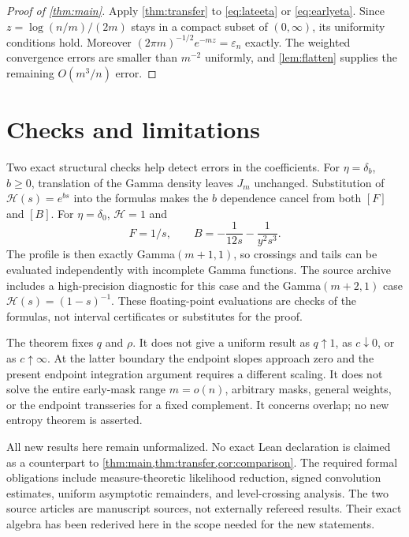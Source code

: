\documentclass[11pt,oneside]{article}
\theoremstyle{remark}\newtheorem{remark}[theorem]{Remark}
\newcommand{\eps}{\varepsilon}
\newcommand{\HH}{\mathcal H}
\numberwithin{equation}{section}
\begin{document}
\begin{proof}[Proof of \cref{thm:main}]
Apply \cref{thm:transfer} to \eqref{eq:lateeta} or \eqref{eq:earlyeta}.
Since $z=\log(n/m)/(2m)$ stays in a compact subset of $(0,\infty)$,
its uniformity conditions hold. Moreover
$(2\pi m)^{-1/2}e^{-mz}=\eps_n$ exactly.
The weighted convergence errors are smaller than $m^{-2}$ uniformly,
and \cref{lem:flatten} supplies the remaining $O(m^3/n)$ error.
\end{proof}

\section{Checks and limitations}
Two exact structural checks help detect errors in the coefficients.
For $\eta=\delta_b$, $b\ge0$, translation of the Gamma density leaves
$J_m$ unchanged. Substitution of $\HH(s)=e^{bs}$ into the formulas makes
the $b$ dependence cancel from both $[F]$ and $[B]$.
For $\eta=\delta_0$, $\HH=1$ and
\begin{equation}
 F=1/s,\qquad B=-\frac1{12s}-\frac1{y^2s^3}.
\end{equation}
The profile is then exactly Gamma$(m+1,1)$, so crossings and tails can
be evaluated independently with incomplete Gamma functions. The source
archive includes a high-precision diagnostic for this case and the
Gamma$(m+2,1)$ case $\HH(s)=(1-s)^{-1}$.
These floating-point evaluations are checks of the formulas, not interval
certificates or substitutes for the proof.

The theorem fixes $q$ and $\rho$. It does not give a uniform result as
$q\uparrow1$, as $c\downarrow0$, or as $c\uparrow\infty$. At the latter
boundary the endpoint slopes approach zero and the present endpoint
integration argument requires a different scaling. It does not solve
the entire early-mask range $m=o(n)$, arbitrary masks, general weights,
or the endpoint transseries for a fixed complement. It concerns overlap;
no new entropy theorem is asserted.

All new results here remain unformalized. No exact Lean declaration is
claimed as a counterpart to \cref{thm:main,thm:transfer,cor:comparison}.
The required formal obligations include measure-theoretic likelihood
reduction, signed convolution estimates, uniform asymptotic remainders,
and level-crossing analysis. The two source articles are manuscript
sources, not externally refereed results. Their exact algebra has been
rederived here in the scope needed for the new statements.
\end{document}
